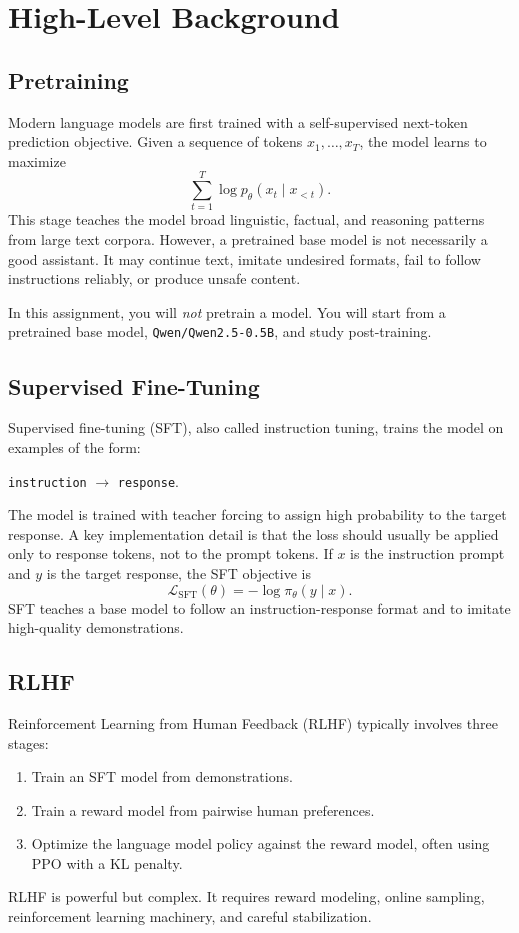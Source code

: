\documentclass[11pt]{article}
\newcommand{\modelname}{\texttt{Qwen/Qwen2.5-0.5B}}
\begin{document}
\section{High-Level Background}

\subsection{Pretraining}
Modern language models are first trained with a self-supervised next-token prediction objective. Given a sequence of tokens $x_1,\ldots,x_T$, the model learns to maximize
\begin{equation}
  \sum_{t=1}^{T} \log p_\theta(x_t \mid x_{<t}).
\end{equation}
This stage teaches the model broad linguistic, factual, and reasoning patterns from large text corpora. However, a pretrained base model is not necessarily a good assistant. It may continue text, imitate undesired formats, fail to follow instructions reliably, or produce unsafe content.

In this assignment, you will \emph{not} pretrain a model. You will start from a pretrained base model, \modelname, and study post-training.

\subsection{Supervised Fine-Tuning}
Supervised fine-tuning (SFT), also called instruction tuning, trains the model on examples of the form:
\begin{center}
\texttt{instruction} $\rightarrow$ \texttt{response}.
\end{center}
The model is trained with teacher forcing to assign high probability to the target response. A key implementation detail is that the loss should usually be applied only to response tokens, not to the prompt tokens. If $x$ is the instruction prompt and $y$ is the target response, the SFT objective is
\begin{equation}
  \mathcal{L}_{\text{SFT}}(\theta) = - \log \pi_\theta(y \mid x).
\end{equation}
SFT teaches a base model to follow an instruction-response format and to imitate high-quality demonstrations.

\subsection{RLHF}
Reinforcement Learning from Human Feedback (RLHF) typically involves three stages:
\begin{enumerate}[leftmargin=*]
  \item Train an SFT model from demonstrations.
  \item Train a reward model from pairwise human preferences.
  \item Optimize the language model policy against the reward model, often using PPO with a KL penalty.
\end{enumerate}
RLHF is powerful but complex. It requires reward modeling, online sampling, reinforcement learning machinery, and careful stabilization.
\end{document}
